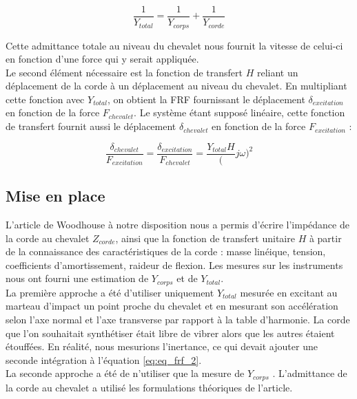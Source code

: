 \begin{equation}
  \frac{1}{Y_{total}} = \frac{1}{Y_{corps}} + \frac{1}{Y_{corde}}
  \label{eq:eq_frf_1}
\end{equation}

Cette admittance totale au niveau du chevalet nous fournit la vitesse de
celui-ci en fonction d'une force qui y serait appliquée. \\

Le second élément nécessaire est la fonction de transfert $H$ reliant un
déplacement de la corde à un déplacement au niveau du chevalet. En multipliant
cette fonction avec $Y_{total}$, on obtient la FRF fournissant le déplacement
$\delta_{excitation}$ en fonction de la force $F_{chevalet}$. Le système étant
supposé linéaire, cette fonction de transfert fournit aussi le déplacement
$\delta_{chevalet}$ en fonction de la force $F_{excitation}$ :

\begin{equation}
  \frac{\delta_{chevalet}}{F_{excitation}} = \frac{\delta_{excitation}}{F_{chevalet}} = \frac{Y_{total}H}({j\omega})^2
  \label{eq:eq_frf_2}
\end{equation}

\subsection{Mise en place}

L'article de Woodhouse à notre disposition nous a permis d'écrire l'impédance
de la corde au chevalet $Z_{corde}$, ainsi que la fonction de transfert
unitaire $H$ à partir de la connaissance des caractéristiques de la corde :
masse linéique, tension, coefficients d'amortissement, raideur de flexion. Les
mesures sur les instruments nous ont fourni une estimation de $Y_{corps}$ et de
$Y_{total}$. \\

La première approche a été d'utiliser uniquement $Y_{total}$ mesurée en
excitant au marteau d'impact un point proche du chevalet et en mesurant son
accélération selon l'axe normal et l'axe transverse par rapport à la table
d'harmonie. La corde que l'on souhaitait synthétiser était libre de vibrer
alors que les autres étaient étouffées. En réalité, nous mesurions l'inertance,
ce qui devait ajouter une seconde intégration à l'équation \ref{eq:eq_frf_2}.\\

La seconde approche a été de n'utiliser que la mesure de $Y_{corps}$ .
L'admittance de la corde au chevalet a utilisé les formulations théoriques de
l'article. \\

